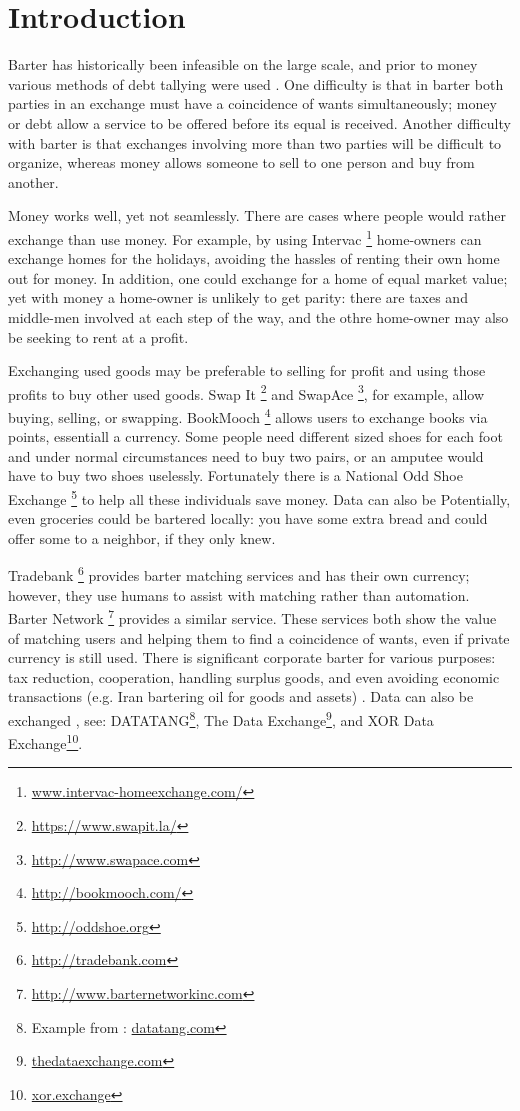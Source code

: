 \documentclass[main.tex]{subfiles}
\begin{document}
\section{Introduction}
Barter has historically been infeasible on the large scale, and prior to money various methods of debt tallying were used \cite{Gra1}. One difficulty is that in barter both parties in an exchange must have a coincidence of wants simultaneously; money or debt allow a service to be offered before its equal is received. Another difficulty with barter is that exchanges involving more than two parties will be difficult to organize, whereas money allows someone to sell to one person and buy from another.

Money works well, yet not seamlessly. There are cases where people would rather exchange than use money. For example, by using Intervac \footnote{\url{www.intervac-homeexchange.com/}} \cite{Abr1} home-owners can exchange homes for the holidays, avoiding the hassles of renting their own home out for money. In addition, one could exchange for a home of equal market value; yet with money a home-owner is unlikely to get parity: there are taxes and middle-men involved at each step of the way, and the othre home-owner may also be seeking to rent at a profit.

Exchanging used goods may be preferable to selling for profit and using those profits to buy other used goods. Swap It \footnote{\url{https://www.swapit.la/}} and SwapAce \footnote{\url{http://www.swapace.com}}, for example, allow buying, selling, or swapping. BookMooch \footnote{\url{http://bookmooch.com/}} allows users to exchange books via points, essentiall a currency. Some people need different sized shoes for each foot and under normal circumstances need to buy two pairs, or an amputee would have to buy two shoes uselessly. Fortunately there is a National Odd Shoe Exchange \footnote{\url{http://oddshoe.org}} to help all these individuals save money. Data can also be  Potentially, even groceries could be bartered locally: you have some extra bread and could offer some to a neighbor, if they only knew.

Tradebank \footnote{\url{http://tradebank.com}} provides barter matching services and has their own currency; however, they use humans to assist with matching rather than automation. Barter Network \footnote{\url{http://www.barternetworkinc.com}} provides a similar service. These services both show the value of matching users and helping them to find a coincidence of wants, even if private currency is still used. There is significant corporate barter for various purposes: tax reduction, cooperation, handling surplus goods, and even avoiding economic transactions (e.g. Iran bartering oil for goods and assets) \cite{art:str}. Data can also be exchanged \cite{art:blo}, see: DATATANG\footnote{Example from \cite{Fang}: \url{datatang.com}}, The Data Exchange\footnote{\url{thedataexchange.com}}, and XOR Data Exchange\footnote{\url{xor.exchange}}.
\end{document}
